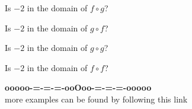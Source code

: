 \documentclass{ximera}
\begin{document}
\begin{question}

Is $-2$ in the domain of $f \circ g$?

\begin{multipleChoice}
\end{multipleChoice}


Is $-2$ in the domain of $g \circ f$?

\begin{multipleChoice}
\end{multipleChoice}



Is $-2$ in the domain of $g \circ g$?

\begin{multipleChoice}
\end{multipleChoice}


Is $-2$ in the domain of $f \circ f$?

\begin{multipleChoice}
\end{multipleChoice}




\end{question}














\begin{center}
\textbf{\textcolor{green!50!black}{ooooo-=-=-=-ooOoo-=-=-=-ooooo}} \\

more examples can be found by following this link\\ 

\end{center}
\end{document}

